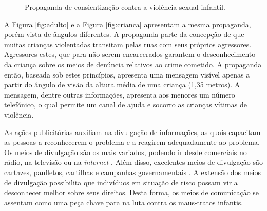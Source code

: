 \begin{figure}[htb]%
  \centering
  \caption{\label{fig:ad}Propaganda de consientização contra a violência sexual infantil.}%
  \hspace{0.01cm}
  \label{fig:example}%
\end{figure}

A Figura \autoref{fig:adulto} e a Figura \autoref{fig:crianca} apresentam a mesma propaganda, porém vista de ângulos diferentes. A propaganda parte da concepção de que muitas crianças violentadas transitam pelas ruas com seus próprios agressores. Agressores estes, que para não serem encarcerados garantem o desconhecimento da criança sobre os meios de denúncia relativos ao crime cometido. A propaganda então, baseada sob estes princípios, apresenta uma mensagem visível apenas a partir do ângulo de visão da altura média de uma criança (1,35 metros). A mensagem, dentre outras informações, apresenta aos menores um número telefónico, o qual permite um canal de ajuda e socorro as crianças vítimas de violência. 

As ações publicitárias auxiliam na divulgação de informações, as quais capacitam as pessoas a reconhecerem o problema e a reagirem adequadamente ao problema. Os meios de divulgação são os mais variados, podendo ir desde comerciais no rádio, na televisão ou na \textit{internet} \cite{martinez2011prevencion}. Além disso, excelentes meios de divulgação são cartazes, panfletos, cartilhas e campanhas governamentais \cite{mendelson2015parent}. A extensão dos meios de divulgação possibilita que indivíduos em situação de risco possam vir a desconhecer melhor sobre seus direitos. Desta forma, os meios de comunicação se assentam como uma peça chave para na luta contra os maus-tratos infantis. 


